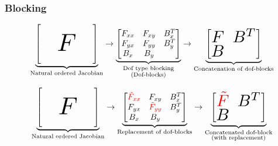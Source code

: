 \documentclass{beamer}
\begin{document}
\begin{frame} \frametitle{Blocking}

\begin{equation*}
\underbrace{
  \begin{bmatrix}
           &   &  \\
           \quad        & \scalebox{3}{$ F$}  & \quad \\
           &   &    
  \end{bmatrix}
}_\text{Natural ordered Jacobian}
\rightarrow
\underbrace{
  \begin{bmatrix}
    F_{xx} & F_{xy} & B_{x}^{T} \\
    F_{yx} & F_{yy} & B_{y}^{T} \\
    B_{x}  & B_{y}  &       
  \end{bmatrix}
}_{\substack{\text{Dof type blocking}\\\text{(Dof-blocks)}}}
\rightarrow
\underbrace{
  \begin{bmatrix}
   \scalebox{2}{$F$} &\scalebox{2}{$ B^{T}$} \\
   \scalebox{2}{$B$} &         
  \end{bmatrix}
}_\text{Concatenation of dof-blocks}
\end{equation*}

\begin{equation*}
\underbrace{
  \begin{bmatrix}
           &   &  \\
           \quad        & \scalebox{3}{$ F$}  & \quad \\
           &   &    
  \end{bmatrix}
}_\text{Natural ordered Jacobian}
\rightarrow
\underbrace{
  \begin{bmatrix}
    \color{red}{\tilde{F}_{xx}} & F_{xy} & B_{x}^{T} \\
    F_{yx} & \color{red}{\tilde{F}_{yy}} & B_{y}^{T} \\
    B_{x}  & B_{y}  &       
  \end{bmatrix}
}_\text{Replacement of dof-blocks}
\rightarrow
\underbrace{
  \begin{bmatrix}
   \scalebox{2}{\color{red}{$\tilde{F}$}} &\scalebox{2}{$ B^{T}$} \\
   \scalebox{2}{$B$} &         
  \end{bmatrix}
}_{\substack{\text{Concatenated dof-block}\\\text{(with replacement)}}}
\end{equation*}
\end{frame}
\end{document}
